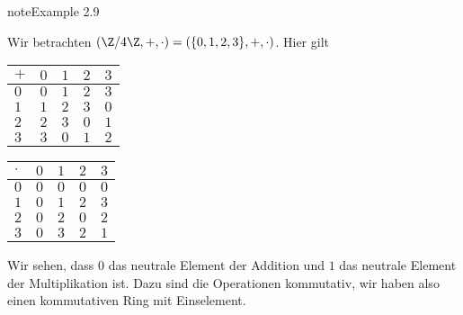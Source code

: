 \documentclass[letterpaper,10pt,english]{jupyterBook}
\begin{document}
\begin{sphinxadmonition}{note}{Example 2.9}



Wir betrachten \((\Z/4\Z, +,\cdot)=(\{0,1,2,3\},+,\cdot)\). Hier gilt


\begin{savenotes}\sphinxattablestart
\centering
\begin{tabulary}{\linewidth}[t]{|T|T|T|T|T|}
\hline
\sphinxstyletheadfamily 
\(+\)
&\sphinxstyletheadfamily 
\(0\)
&\sphinxstyletheadfamily 
\(1\)
&\sphinxstyletheadfamily 
\(2\)
&\sphinxstyletheadfamily 
\(3\)
\\
\hline
\(0\)
&
\(0\)
&
\(1\)
&
\(2\)
&
\(3\)
\\
\hline
\(1\)
&
\(1\)
&
\(2\)
&
\(3\)
&
\(0\)
\\
\hline
\(2\)
&
\(2\)
&
\(3\)
&
\(0\)
&
\(1\)
\\
\hline
\(3\)
&
\(3\)
&
\(0\)
&
\(1\)
&
\(2\)
\\
\hline
\end{tabulary}
\par
\sphinxattableend\end{savenotes}


\begin{savenotes}\sphinxattablestart
\centering
\begin{tabulary}{\linewidth}[t]{|T|T|T|T|T|}
\hline
\sphinxstyletheadfamily 
\(\cdot\)
&\sphinxstyletheadfamily 
\(0\)
&\sphinxstyletheadfamily 
\(1\)
&\sphinxstyletheadfamily 
\(2\)
&\sphinxstyletheadfamily 
\(3\)
\\
\hline
\(0\)
&
\(0\)
&
\(0\)
&
\(0\)
&
\(0\)
\\
\hline
\(1\)
&
\(0\)
&
\(1\)
&
\(2\)
&
\(3\)
\\
\hline
\(2\)
&
\(0\)
&
\(2\)
&
\(0\)
&
\(2\)
\\
\hline
\(3\)
&
\(0\)
&
\(3\)
&
\(2\)
&
\(1\)
\\
\hline
\end{tabulary}
\par
\sphinxattableend\end{savenotes}

Wir sehen, dass \(0\) das neutrale Element der Addition und \(1\) das neutrale Element der Multiplikation ist. Dazu sind die Operationen kommutativ, wir haben also einen kommutativen Ring mit Einselement.
\end{sphinxadmonition}
\end{document}
